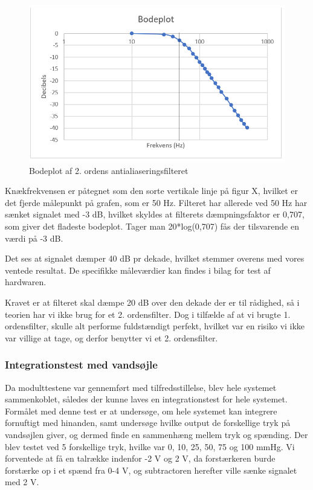 \begin{figure}[h!]
	\centering
	\includegraphics[width=0.8\linewidth]{../Rapport/Implementering_og_test/Hardware/filter2}
	\caption{Bodeplot af 2. ordens antialiaseringsfilteret}
	\label{fig:filter}
\end{figure}

Knækfrekvensen er påtegnet som den sorte vertikale linje på figur X, hvilket er det fjerde målepunkt på grafen, som er 50 Hz. Filteret har allerede ved 50 Hz har sænket signalet med -3 dB, hvilket skyldes at filterets dæmpningsfaktor er 0,707, som giver det fladeste bodeplot. Tager man 20*log(0,707) fås der tilsvarende en værdi på -3 dB.

Det ses at signalet dæmper 40 dB pr dekade, hvilket stemmer overens med vores ventede resultat. De specifikke måleværdier kan findes i bilag for test af hardwaren.

Kravet er at filteret skal dæmpe 20 dB over den dekade der er til rådighed, så i teorien har vi ikke brug for et 2. ordensfilter. Dog i tilfælde af at vi brugte 1. ordensfilter, skulle alt performe fuldstændigt perfekt, hvilket var en risiko vi ikke var villige at tage, og derfor benytter vi et 2. ordensfilter.

\clearpage

\subsubsection{Integrationstest med vandsøjle}

Da modulttestene var gennemført med tilfredsstillelse, blev hele systemet sammenkoblet, således der kunne laves en integrationstest for hele systemet. Formålet med denne test er at undersøge, om hele systemet kan integrere fornuftigt med hinanden, samt undersøge hvilke output de forskellige tryk på vandsøjlen giver, og dermed finde en sammenhæng mellem tryk og spænding.
Der blev testet ved 5 forskellige tryk, hvilke var 0, 10, 25, 50, 75 og 100 mmHg. Vi forventede at få en talrække indenfor -2 V og 2 V, da forstærkeren burde forstærke op i et spænd fra 0-4 V, og subtractoren herefter ville sænke signalet med 2 V.


